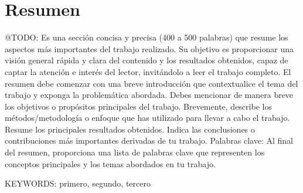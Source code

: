 \newpage
\section*{Resumen}
\colorbox{color_highlight}{@TODO:}
Es una sección concisa y precisa (400 a 500 palabras) que resume los aspectos más importantes del trabajo
realizado.
Su objetivo es proporcionar una visión general rápida y clara del contenido y los resultados obtenidos,
capaz de captar la atención e interés del lector, invitándolo a leer el trabajo completo.
El resumen debe comenzar con una breve introducción que contextualice el tema del trabajo y exponga la problemática
abordada.
Debes mencionar de manera breve los objetivos o propósitos principales del trabajo.
Brevemente, describe los métodos/metodología o enfoque que has utilizado para llevar a cabo el trabajo.
Resume los principales resultados
obtenidos.
Indica las conclusiones o contribuciones más importantes derivadas de tu trabajo.
Palabras clave: Al final del resumen, proporciona una lista de palabras clave que representen los conceptos
principales y los temas abordados en tu trabajo.

\vspace{0.5cm}
KEYWORDS: primero, segundo, tercero